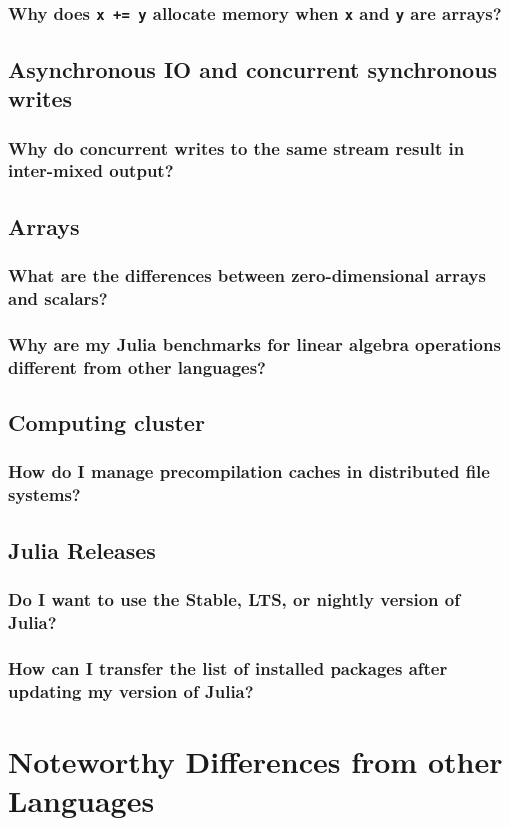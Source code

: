     \subsection{Why does \texttt{x += y} allocate memory when \texttt{x} and \texttt{y} are arrays?}
    \section{Asynchronous IO and concurrent synchronous writes}
    \subsection{Why do concurrent writes to the same stream result in inter-mixed output?}
    \section{Arrays}
    \subsection{What are the differences between zero-dimensional arrays and scalars?}
    \subsection{Why are my Julia benchmarks for linear algebra operations different from other languages?}
    \section{Computing cluster}
    \subsection{How do I manage precompilation caches in distributed file systems?}
    \section{Julia Releases}
    \subsection{Do I want to use the Stable, LTS, or nightly version of Julia?}
    \subsection{How can I transfer the list of installed packages after updating my version of Julia?}
  \chapter{Noteworthy Differences from other Languages}
